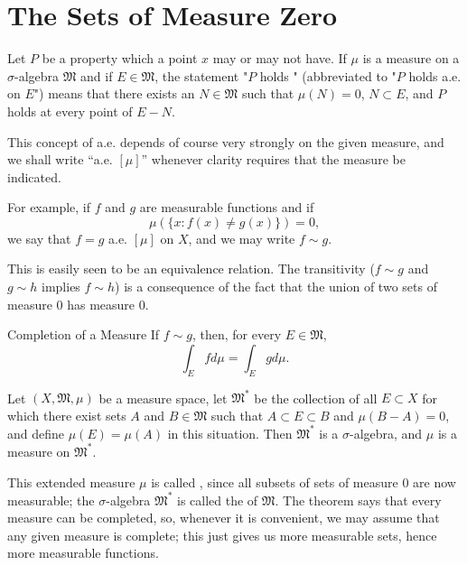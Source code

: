 \documentclass[../main.tex]{subfiles}
\begin{document}
\section{The Sets of Measure Zero}

\begin{definition}{}{}
Let $P$ be a property which a point $x$ may or may not have. If $\mu$ is a measure on a $\sigma$-algebra $\mathfrak{M}$ and if $E \in \mathfrak{M}$, the statement "$P$ holds " (abbreviated to "$P$ holds a.e. on $E$") means that there exists an $N \in \mathfrak{M}$ such that $\mu(N) = 0$, $N \subset E$, and $P$ holds at every point of $E - N$.
\end{definition}

\begin{remark}
     This concept of a.e. depends of course very strongly on the given measure, and we shall write “a.e. $[\mu]$” whenever clarity requires that the measure be indicated.
\end{remark}

\begin{example}{}{}
    For example, if $f$ and $g$ are measurable functions and if
\[
\mu(\{x: f(x) \neq g(x)\}) = 0,
\]
we say that $f = g$ a.e. $[\mu]$ on $X$, and we may write $f \sim g$. 
\end{example}
\begin{remark}
  This is easily seen to be an equivalence relation.  The transitivity ($f \sim g$ and $g \sim h$ implies $f \sim h$) is a consequence of the fact that the union of two sets of measure 0 has measure 0.
\end{remark}

\begin{proposition}{Completion of a Measure}{}
  If $f \sim g$, then, for every $E \in \mathfrak{M}$,
\[
\int_E f d\mu = \int_E g d\mu.
\]

\end{proposition}

\begin{theorem}{}{}
Let $(X, \mathfrak{M}, \mu)$ be a measure space, let $\mathfrak{M}^*$ be the collection of all $E \subset X$ for which there exist sets $A$ and $B \in \mathfrak{M}$ such that $A \subset E \subset B$ and $\mu(B - A) = 0$, and define $\mu(E) = \mu(A)$ in this situation. Then $\mathfrak{M}^*$ is a $\sigma$-algebra, and $\mu$ is a measure on $\mathfrak{M}^*$.
\end{theorem}

\begin{remark}
    
This extended measure $\mu$ is called , since all subsets of sets of measure 0 are now measurable; the $\sigma$-algebra $\mathfrak{M}^*$ is called the  of $\mathfrak{M}$. The theorem says that every measure can be completed, so, whenever it is convenient, we may assume that any given measure is complete; this just gives us more measurable sets, hence more measurable functions. 

\end{remark}
\end{document}
